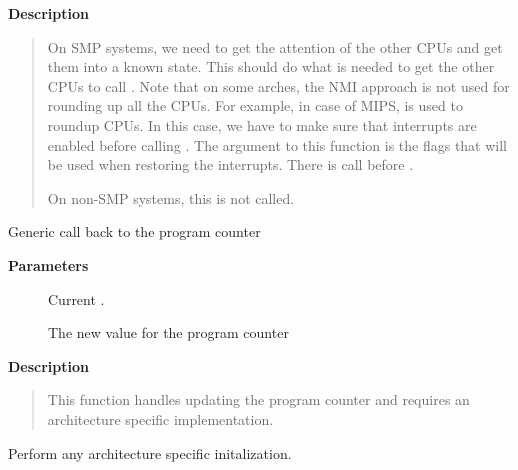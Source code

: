 \documentclass[a4paper,8pt,english]{sphinxmanual}
\begin{document}
\textbf{Description}
\begin{quote}

On SMP systems, we need to get the attention of the other CPUs
and get them into a known state.  This should do what is needed
to get the other CPUs to call . Note that on some arches,
the NMI approach is not used for rounding up all the CPUs. For example,
in case of MIPS,  is used to roundup CPUs. In
this case, we have to make sure that interrupts are enabled before
calling . The argument to this function is
the flags that will be used when restoring the interrupts. There is
 call before {\hyperref[dev\string-tools/kgdb:c.kgdb_roundup_cpus]{\emph{}}}.

On non-SMP systems, this is not called.
\end{quote}

\begin{fulllineitems}
\label{dev-tools/kgdb:c.kgdb_arch_set_pc}
Generic call back to the program counter

\end{fulllineitems}


\textbf{Parameters}
\begin{description}
\item[{}] \leavevmode
Current .

\item[{}] \leavevmode
The new value for the program counter

\end{description}

\textbf{Description}
\begin{quote}

This function handles updating the program counter and requires an
architecture specific implementation.
\end{quote}

\begin{fulllineitems}
\label{dev-tools/kgdb:c.kgdb_arch_late}
Perform any architecture specific initalization.

\end{fulllineitems}
\end{document}

